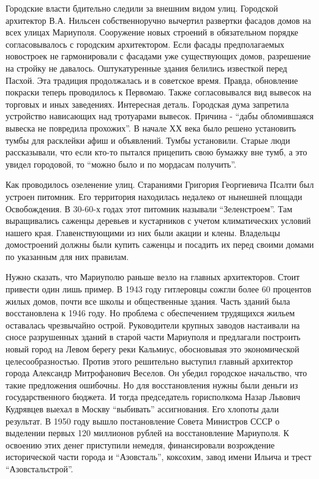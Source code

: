 
Городские власти бдительно следили за внешним видом улиц. Городской архитектор
В.А. Нильсен собственноручно вычертил развертки фасадов домов на всех улицах
Мариуполя. Сооружение новых строений в обязательном порядке согласовывалось с
городским архитектором. Если фасады предполагаемых новостроек не гармонировали
с фасадами уже существующих домов, разрешение на стройку не давалось.
Оштукатуренные здания белились известкой перед Пасхой. Эта традиция
продолжалась и в советское время. Правда, обновление покраски теперь
проводилось к Первомаю. Также согласовывался вид вывесок на торговых и иных
заведениях. Интересная деталь. Городская дума запретила устройство нависающих
над тротуарами вывесок. Причина - \enquote{дабы обломившаяся вывеска не повредила
прохожих}. В начале ХХ века было решено установить тумбы для расклейки афиш и
объявлений. Тумбы установили. Старые люди рассказывали, что  если кто-то
пытался прицепить свою бумажку вне тумб, а это увидел городовой, то \enquote{можно было
и по мордасам получить}.


Как проводилось озеленение улиц. Стараниями Григория Георгиевича Псалти был
устроен питомник. Его территория находилась недалеко от нынешней площади
Освобождения. В 30-60-х годах этот питомник называли \enquote{Зеленстроем}. Там
выращивались саженцы деревьев и кустарников с учетом климатических условий
нашего края. Главенствующими из них были акации и клены. Владельцы домостроений
должны были купить саженцы и посадить их перед своими  домами по указанным для
них правилам.


Нужно сказать, что Мариуполю раньше везло на главных архитекторов. Стоит
привести один лишь пример. В 1943 году гитлеровцы сожгли более 60 процентов
жилых домов, почти все школы и общественные здания. Часть зданий была
восстановлена к 1946 году. Но проблема с обеспечением трудящихся жильем
оставалась чрезвычайно острой. Руководители крупных заводов настаивали на сносе
разрушенных зданий в старой части Мариуполя и предлагали построить новый город
на Левом берегу реки Кальмиус, обосновывая это экономической целесообразностью.
Против этого решительно выступил главный архитектор города Александр
Митрофанович Веселов. Он убедил городское начальство, что такие предложения
ошибочны. Но для восстановления нужны были деньги из государственного бюджета.
И тогда председатель горисполкома Назар Львович Кудрявцев выехал в Москву
\enquote{выбивать} ассигнования. Его хлопоты дали результат. В 1950 году вышло
постановление Совета Министров СССР о выделении первых 120 миллионов рублей на
восстановление Мариуполя. К освоению этих денег приступили немедля,
финансировали возрождение исторической части города  и \enquote{Азовсталь}, коксохим,
завод имени Ильича и трест \enquote{Азовстальстрой}.

